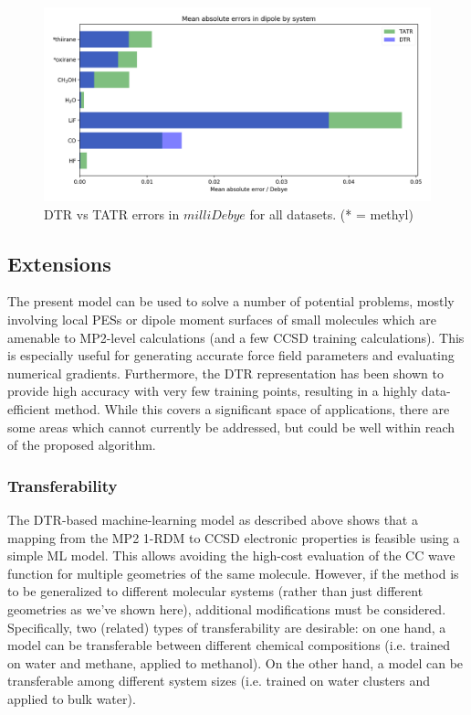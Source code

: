 \begin{figure}
    \centering
    \includegraphics[angle=90, scale=.9]{p2/figures/D_err.png}
    \caption{DTR vs TATR errors in $milliDebye$ for all datasets. (* = methyl)}
    \label{fig:D_sum}
\end{figure}

\subsection{Extensions} \label{ext}
The present model can be used to solve a number of potential problems, mostly involving local PESs or dipole moment surfaces of small molecules which are amenable to MP2-level calculations (and a few CCSD training calculations). This is especially useful for generating accurate force field parameters\cite{Sauceda2019,Galvelis2019} and evaluating numerical gradients\cite{Schmitz2018a}. Furthermore, the DTR representation has been shown to provide high accuracy with very few training points, resulting in a highly data-efficient method. While this covers a significant space of applications, there are some areas which cannot currently be addressed, but could be well within reach of the proposed algorithm. 

\subsubsection{Transferability} 
The DTR-based machine-learning model as described above shows that a mapping from the MP2 1-RDM to CCSD electronic properties is feasible using a simple ML model. This allows avoiding the high-cost evaluation of the CC wave function for multiple geometries of the same molecule. However, if the method is to be generalized to different molecular systems (rather than just different geometries as we've shown here), additional modifications must be considered. Specifically, two (related) types of transferability are desirable: on one hand, a model can be transferable between different chemical compositions (i.e. trained on water and methane, applied to methanol)\cite{Welborn2018a}. 
On the other hand, a model can be transferable among different system sizes (i.e. trained on water clusters and applied to bulk water)\cite{Jung2020}.
 
